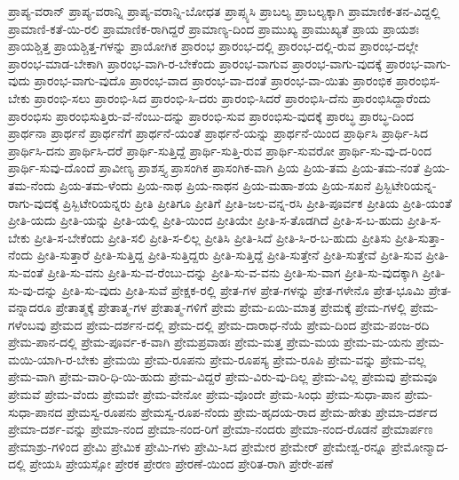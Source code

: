 {ಪ್ರಾಪ್ಯ-ವರಾನ್
ಪ್ರಾಪ್ಯ-ವರಾನ್ನಿ
ಪ್ರಾಪ್ಯ-ವರಾನ್ನಿ-ಬೋಧತ
ಪ್ರಾಪ್ಸ್ಯಸಿ
ಪ್ರಾಬಲ್ಯ
ಪ್ರಾಬಲ್ಯಕ್ಕಾಗಿ
ಪ್ರಾಮಾಣಿಕ-ತನ-ವಿದ್ದಲ್ಲಿ
ಪ್ರಾಮಾಣಿ-ಕತೆ-ಯಿ-ರಲಿ
ಪ್ರಾಮಾಣಿಕ-ರಾಗಿದ್ದರೆ
ಪ್ರಾಮಾಣ್ಯ-ದಿಂದ
ಪ್ರಾಮುಖ್ಯ
ಪ್ರಾಮುಖ್ಯತೆ
ಪ್ರಾಯ
ಪ್ರಾಯಶಃ
ಪ್ರಾಯಶ್ಚಿತ್ತ
ಪ್ರಾಯಶ್ಚಿತ್ತ-ಗಳನ್ನು
ಪ್ರಾಯೋಗಿಕ
ಪ್ರಾರಂಭ
ಪ್ರಾರಂಭ-ದಲ್ಲಿ
ಪ್ರಾರಂಭ-ದಲ್ಲಿ-ರುವ
ಪ್ರಾರಂಭ-ದಲ್ಲೇ
ಪ್ರಾರಂಭ-ಮಾಡ-ಬೇಕಾಗಿ
ಪ್ರಾರಂಭ-ವಾಗಿ-ರ-ಬೇಕೆಂದು
ಪ್ರಾರಂಭ-ವಾಗುವ
ಪ್ರಾರಂಭ-ವಾಗು-ವುದಕ್ಕೆ
ಪ್ರಾರಂಭ-ವಾಗು-ವುದು
ಪ್ರಾರಂಭ-ವಾಗು-ವುದೊ
ಪ್ರಾರಂಭ-ವಾದ
ಪ್ರಾರಂಭ-ವಾ-ದಂತೆ
ಪ್ರಾರಂಭ-ವಾ-ಯಿತು
ಪ್ರಾರಂಭಿಕ
ಪ್ರಾರಂಭಿಸ-ಬೇಕು
ಪ್ರಾರಂಭಿ-ಸಲು
ಪ್ರಾರಂಭಿ-ಸಿದ
ಪ್ರಾರಂಭಿ-ಸಿ-ದರು
ಪ್ರಾರಂಭಿ-ಸಿದರೆ
ಪ್ರಾರಂಭಿಸಿ-ದೆನು
ಪ್ರಾರಂಭಿಸಿದ್ದಾರೆಂದು
ಪ್ರಾರಂಭಿಸು
ಪ್ರಾರಂಭಿಸುತ್ತಿರು-ವೆ-ನೆಂಬು-ದನ್ನು
ಪ್ರಾರಂಭಿ-ಸುವ
ಪ್ರಾರಂಭಿಸು-ವುದಕ್ಕೆ
ಪ್ರಾರಬ್ಧ
ಪ್ರಾರಬ್ಧ-ದಿಂದ
ಪ್ರಾರ್ಥನಾ
ಪ್ರಾರ್ಥನೆ
ಪ್ರಾರ್ಥನೆಗೆ
ಪ್ರಾರ್ಥನೆ-ಯಂತೆ
ಪ್ರಾರ್ಥನೆ-ಯನ್ನು
ಪ್ರಾರ್ಥನೆ-ಯಿಂದ
ಪ್ರಾರ್ಥಿಸಿ
ಪ್ರಾರ್ಥಿ-ಸಿದ
ಪ್ರಾರ್ಥಿಸಿ-ದನು
ಪ್ರಾರ್ಥಿಸಿ-ದರೆ
ಪ್ರಾರ್ಥಿ-ಸುತ್ತಿದ್ದೆ
ಪ್ರಾರ್ಥಿ-ಸುತ್ತಿ-ರುವ
ಪ್ರಾರ್ಥಿ-ಸುವರೋ
ಪ್ರಾರ್ಥಿ-ಸು-ವು-ದ-ರಿಂದ
ಪ್ರಾರ್ಥಿ-ಸುವು-ದೊಂದೆ
ಪ್ರಾವೀಣ್ಯ
ಪ್ರಾಶಸ್ತ್ಯ
ಪ್ರಾಸಂಗಿಕ
ಪ್ರಾಸಂಗಿಕ-ವಾಗಿ
ಪ್ರಿಯ
ಪ್ರಿಯ-ತಮ
ಪ್ರಿಯ-ತಮ-ನಂತೆ
ಪ್ರಿಯ-ತಮ-ನೆಂದು
ಪ್ರಿಯ-ತಮ-ಳೆಂದು
ಪ್ರಿಯ-ನಾಥ
ಪ್ರಿಯ-ನಾಥನ
ಪ್ರಿಯ-ಮಹಾ-ಶಯ
ಪ್ರಿಯ-ಸಖನೆ
ಪ್ರಿಸ್ಬಿಟೇರಿಯನ್ನ-ರಾಗು-ವುದಕ್ಕೆ
ಪ್ರಿಸ್ಬಿಟೇರಿಯನ್ನರು
ಪ್ರೀತಿ
ಪ್ರೀತಿಗೂ
ಪ್ರೀತಿಗೆ
ಪ್ರೀತಿ-ಜಲ-ವನ್ನ-ರಸಿ
ಪ್ರೀತಿ-ಪೂರ್ವಕ
ಪ್ರೀತಿಯ
ಪ್ರೀತಿ-ಯಂತೆ
ಪ್ರೀತಿ-ಯದು
ಪ್ರೀತಿ-ಯನ್ನು
ಪ್ರೀತಿ-ಯಲ್ಲಿ
ಪ್ರೀತಿ-ಯಿಂದ
ಪ್ರೀತಿಯೇ
ಪ್ರೀತಿ-ಸ-ತೊಡಗಿದೆ
ಪ್ರೀತಿ-ಸ-ಬ-ಹುದು
ಪ್ರೀತಿ-ಸ-ಬೇಕು
ಪ್ರೀತಿ-ಸ-ಬೇಕೆಂದು
ಪ್ರೀತಿ-ಸಲಿ
ಪ್ರೀತಿ-ಸ-ಲಿಲ್ಲ
ಪ್ರೀತಿಸಿ
ಪ್ರೀತಿ-ಸಿದೆ
ಪ್ರೀತಿ-ಸಿ-ರ-ಬ-ಹುದು
ಪ್ರೀತಿಸು
ಪ್ರೀತಿ-ಸುತ್ತಾ-ನೆಂದು
ಪ್ರೀತಿ-ಸುತ್ತಾರೆ
ಪ್ರೀತಿ-ಸುತ್ತಿದ್ದ
ಪ್ರೀತಿ-ಸುತ್ತಿದ್ದರು
ಪ್ರೀತಿ-ಸುತ್ತಿದ್ದೆ
ಪ್ರೀತಿ-ಸುತ್ತೇನೆ
ಪ್ರೀತಿ-ಸುತ್ತೇವೆ
ಪ್ರೀತಿ-ಸುವ
ಪ್ರೀತಿ-ಸು-ವಂತೆ
ಪ್ರೀತಿ-ಸು-ವನು
ಪ್ರೀತಿ-ಸು-ವ-ರೆಂಬು-ದನ್ನು
ಪ್ರೀತಿ-ಸು-ವ-ವನು
ಪ್ರೀತಿ-ಸು-ವಾಗ
ಪ್ರೀತಿ-ಸು-ವುದಕ್ಕಾಗಿ
ಪ್ರೀತಿ-ಸು-ವು-ದನ್ನು
ಪ್ರೀತಿ-ಸು-ವುದು
ಪ್ರೀತಿ-ಸುವೆ
ಪ್ರೇಕ್ಷಕ-ರಲ್ಲಿ
ಪ್ರೇತ-ಗಳ
ಪ್ರೇತ-ಗಳನ್ನು
ಪ್ರೇತ-ಗಳೇನೊ
ಪ್ರೇತ-ಭೂಮಿ
ಪ್ರೇತ-ವನ್ನಾದರೂ
ಪ್ರೇತಾತ್ಮಕ್ಕೆ
ಪ್ರೇತಾತ್ಮ-ಗಳ
ಪ್ರೇತಾತ್ಮ-ಗಳಿಗೆ
ಪ್ರೇಮ
ಪ್ರೇಮ-ಏಯಿ-ಮಾತ್ರ
ಪ್ರೇಮಕ್ಕೆ
ಪ್ರೇಮ-ಗಳಲ್ಲಿ
ಪ್ರೇಮ-ಗಳೆಂಬವು
ಪ್ರೇಮದ
ಪ್ರೇಮ-ದರ್ಶನ-ದಲ್ಲಿ
ಪ್ರೇಮ-ದಲ್ಲಿ
ಪ್ರೇಮ-ದಾರಾಧ-ನೆಯೆ
ಪ್ರೇಮ-ದಿಂದ
ಪ್ರೇಮ-ಪಂಜ-ರದಿ
ಪ್ರೇಮ-ಪಾನ-ದಲ್ಲಿ
ಪ್ರೇಮ-ಪೂರ್ವ-ಕ-ವಾಗಿ
ಪ್ರೇಮಪ್ರವಾಹಃ
ಪ್ರೇಮ-ಮತ್ತ
ಪ್ರೇಮ-ಮಯ
ಪ್ರೇಮ-ಮ-ಯನು
ಪ್ರೇಮ-ಮಯಿ-ಯಾಗಿ-ರ-ಬೇಕು
ಪ್ರೇಮಯಿ
ಪ್ರೇಮ-ರೂಪನು
ಪ್ರೇಮ-ರೂಪಸ್ಯ
ಪ್ರೇಮ-ರೂಪಿ
ಪ್ರೇಮ-ವನ್ನು
ಪ್ರೇಮ-ವಲ್ಲ
ಪ್ರೇಮ-ವಾಗಿ
ಪ್ರೇಮ-ವಾರಿ-ಧಿ-ಯಿ-ಹುದು
ಪ್ರೇಮ-ವಿದ್ದರೆ
ಪ್ರೇಮ-ವಿರು-ವು-ದಿಲ್ಲ
ಪ್ರೇಮ-ವಿಲ್ಲ
ಪ್ರೇಮವು
ಪ್ರೇಮವೂ
ಪ್ರೇಮವೆ
ಪ್ರೇಮ-ವೆಂದು
ಪ್ರೇಮವೇ
ಪ್ರೇಮ-ವೇನೋ
ಪ್ರೇಮ-ವೊಂದೇ
ಪ್ರೇಮ-ಸಿಂಧು
ಪ್ರೇಮ-ಸುಧಾ-ಪಾನ
ಪ್ರೇಮ-ಸುಧಾ-ಪಾನದ
ಪ್ರೇಮಸ್ವ-ರೂಪನು
ಪ್ರೇಮಸ್ವ-ರೂಪ-ನೆಂದು
ಪ್ರೇಮ-ಹೃದಯ-ರಾದ
ಪ್ರೇಮ-ಹೇತು
ಪ್ರೇಮಾ-ದರ್ಶದ
ಪ್ರೇಮಾ-ದರ್ಶ-ವನ್ನು
ಪ್ರೇಮಾ-ನಂದ
ಪ್ರೇಮಾ-ನಂದ-ರಿಗೆ
ಪ್ರೇಮಾ-ನಂದರು
ಪ್ರೇಮಾ-ನಂದ-ರೊಡನೆ
ಪ್ರೇಮಾರ್ಪಣ
ಪ್ರೇಮಾಶ್ರು-ಗಳಿಂದ
ಪ್ರೇಮಿ
ಪ್ರೇಮಿಕ
ಪ್ರೇಮಿ-ಗಳು
ಪ್ರೇಮಿ-ಸಿದ
ಪ್ರೇಮೇರ
ಪ್ರೇಮೇರ್
ಪ್ರೇಮೇಶ್ವ-ರನ್ನೂ
ಪ್ರೇಮೋನ್ಮಾದ-ದಲ್ಲಿ
ಪ್ರೇಯಸಿ
ಪ್ರೇಯಸ್ಸೋ
ಪ್ರೇರಕ
ಪ್ರೇರಣ
ಪ್ರೇರಣೆ-ಯಿಂದ
ಪ್ರೇರಿತ-ರಾಗಿ
ಪ್ರೇರೇ-ಪಣೆ
}
